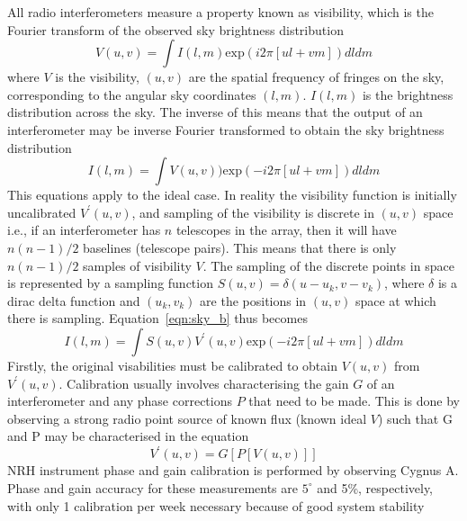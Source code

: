 All radio interferometers measure a property known as visibility, which is the Fourier transform of the observed sky brightness distribution
\begin{equation}
V(u,v)=\int I(l,m)\mathrm{exp}(i2\pi[ul +vm])dldm
\end{equation}
where $V$ is the visibility, $(u,v)$ are the spatial frequency of fringes on the sky, corresponding to the angular sky coordinates $(l,m)$. $I(l,m)$ is the brightness distribution across the sky. The inverse of this means that the output of an interferometer may be inverse Fourier transformed to obtain the sky brightness distribution
\begin{equation}
I(l,m)=\int V(u,v))\mathrm{exp}(-i2\pi[ul +vm])dldm
\label{eqn:sky_b}
\end{equation}
This equations apply to the ideal case. In reality the visibility function is initially uncalibrated $V^{'}(u,v)$, and sampling of the visibility is discrete in $(u,v)$ space i.e., if an interferometer has $n$ telescopes in the array, then it will have $n(n-1)/2$ baselines (telescope pairs). This means that there is only $n(n-1)/2$ samples of visibility $V$. The sampling of the discrete points in space is represented by a sampling function $S(u,v) = \delta(u-u_k, v-v_k)$, where $\delta$ is a dirac delta function and $(u_k, v_k)$ are the positions in $(u, v)$ space at which there is sampling. Equation~\ref{eqn:sky_b} thus becomes
\begin{equation}
I(l,m)=\int S(u,v)V^{'}(u,v)\mathrm{exp}(-i2\pi[ul +vm])dldm
\label{eqn:VS}
\end{equation}
Firstly, the original visabilities must be calibrated to obtain $V(u,v)$ from $V^{'}(u,v)$. Calibration usually involves characterising the gain $G$ of an interferometer and any phase corrections $P$ that need to be made. This is done by observing a strong radio point source of known flux (known ideal $V$) such that G and P may be characterised in the equation
\begin{equation}
V^{'}(u,v) = G[ P[V(u,v)] ]
\end{equation}
NRH instrument phase and gain calibration is performed by observing Cygnus A. Phase and gain accuracy for these measurements are $5^{\circ}$ and 5\%, respectively, with only 1 calibration per week necessary because of good system stability \citep{avignon1989}

